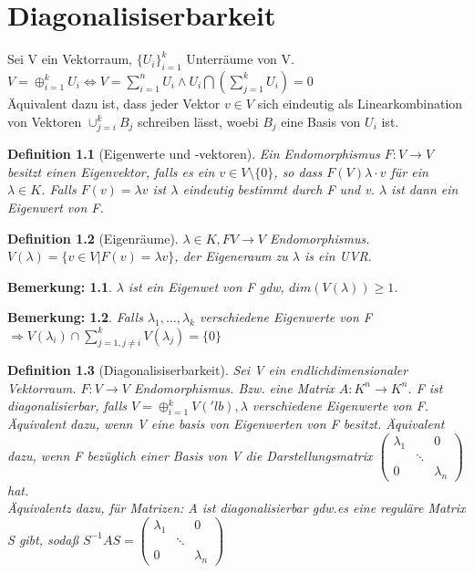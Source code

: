\documentclass{report}
\newcommand{\lb}{\lambda}
\theoremstyle{customrem}
\newtheorem*{bemerkung}{Bemerkung\textnormal:}
\theoremstyle{customdef}
\newtheorem{definition}{Definition}[chapter]
\theoremstyle{customenv}
\begin{document}
\chapter{Diagonalisiserbarkeit}
Sei V ein Vektorraum, \(\{U_i\}_{i=1}^k\) Unterr\"aume von V.\\
\(V = \oplus_{i=1}^k U_i
\Leftrightarrow V = \sum_{i=1}^n U_i \land U_i \bigcap(\sum_{j=1}^k U_i) = 0\)\\
\"Aquivalent dazu ist, dass jeder Vektor \(v \in V\) sich eindeutig als
Linearkombination von Vektoren \(\cup_{j=i}^k B_j\) schreiben l\"asst, woebi
\(B_j\) eine Basis von \(U_i\) ist.

\begin{definition}[Eigenwerte und -vektoren]
  Ein Endomorphismus \(F : V \to V\) besitzt einen Eigenvektor, falls es ein
  \(v \in V \setminus \{0\}\), so dass \(F(V)  \lb \cdot v\) f\"ur ein
  \(\lb \in K\). Falls \(F(v) = \lb v\) ist \(\lambda\) eindeutig bestimmt durch
  F und v. \(\lambda\) ist dann ein Eigenwert von F.
\end{definition}

\begin{definition}[Eigenr\"aume]
  \(\lb \in K, F V \to V\) Endomorphismus.\\
  \(V(\lb) = \{v \in V | F(v) = \lb v\}\), der Eigeneraum zu \(\lb\) is ein UVR.
\end{definition}

\begin{bemerkung}
  \(\lb\) ist ein Eigenwet von F gdw, \(dim(V(\lb)) \ge 1\).
\end{bemerkung}

\begin{bemerkung}
  Falls \(\lb_1, \dots, \lb_k\) verschiedene Eigenwerte von F \(\Rightarrow
  V(\lb_i) \cap \sum_{j=1, j \neq i}^k V(\lb_j) = \{0\}\)
\end{bemerkung}


\begin{definition}[Diagonalisiserbarkeit]
  Sei V ein endlichdimensionaler Vektorraum. \(F : V \to V\) Endomorphismus.
  Bzw. eine Matrix \(A : K^n \to K^n\). F ist diagonalisierbar, falls
  \(V = \oplus_{i=1}^k V('lb), \lb\) verschiedene Eigenwerte von F.\\
  \"Aquivalent dazu, wenn V eine basis von Eigenwerten von F besitzt.
  \"Aquivalent dazu, wenn F bez\"uglich einer Basis von V die Darstellungsmatrix
  \(
    \begin{pmatrix}
      \lb_1  &        & 0\\
             & \ddots &\\
      0      &        & \lb_n
    \end{pmatrix}
  \) hat.\\
  \"Aquivalentz dazu, f\"ur Matrizen: A ist diagonalisierbar gdw.es eine regul\"are
  Matrix S gibt, soda\ss{} \(S^{-1}AS = 
  \begin{pmatrix}
    \lb_1  &        & 0\\
           & \ddots &\\
    0      &        & \lb_n
  \end{pmatrix}\)
\end{definition}
\end{document}
